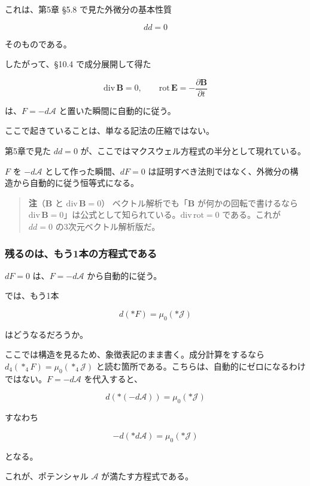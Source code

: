 \documentclass[a4paper,12pt,openany]{book}
\begin{document}
これは、第5章 §5.8 で見た外微分の基本性質

\[
dd=0
\]

そのものである。

したがって、§10.4 で成分展開して得た

\[
\mathrm{div}\,\mathbf{B}=0,
\qquad
\mathrm{rot}\,\mathbf{E}
=
-\frac{\partial\mathbf{B}}{\partial t}
\]

は、\(F=-d\mathcal{A}\) と置いた瞬間に自動的に従う。

ここで起きていることは、単なる記法の圧縮ではない。

第5章で見た \(dd=0\)
が、ここではマクスウェル方程式の半分として現れている。

\(F\) を \(-d\mathcal{A}\) として作った瞬間、\(dF=0\)
は証明すべき法則ではなく、外微分の構造から自動的に従う恒等式になる。

\begin{quote}
\textbf{注}（\(\mathbf{B}\) と \(\mathrm{div}\,\mathbf{B}=0\)）
ベクトル解析でも「\(\mathbf{B}\) が何かの回転で書けるなら
\(\mathrm{div}\,\mathbf{B}=0\)」は公式として知られている。\(\mathrm{div}\,\mathrm{rot}=0\)
である。これが \(dd=0\) の3次元ベクトル解析版だ。
\end{quote}

\hypertarget{ux6b8bux308bux306eux306fux3082ux30461ux672cux306eux65b9ux7a0bux5f0fux3067ux3042ux308b}{%
\subsubsection{残るのは、もう1本の方程式である}\label{ux6b8bux308bux306eux306fux3082ux30461ux672cux306eux65b9ux7a0bux5f0fux3067ux3042ux308b}}

\(dF=0\) は、\(F=-d\mathcal{A}\) から自動的に従う。

では、もう1本

\[
d(\ast F)
=
\mu_0(\ast\mathcal{J})
\]

はどうなるだろうか。

ここでは構造を見るため、象徴表記のまま書く。成分計算をするなら
\(d_4(\ast_4F)=\mu_0(\ast_4\mathcal{J})\)
と読む箇所である。こちらは、自動的にゼロになるわけではない。\(F=-d\mathcal{A}\)
を代入すると、

\[
d(\ast(-d\mathcal{A}))
=
\mu_0(\ast\mathcal{J})
\]

すなわち

\[
-d(\ast d\mathcal{A})
=
\mu_0(\ast\mathcal{J})
\]

となる。

これが、ポテンシャル \(\mathcal{A}\) が満たす方程式である。
\end{document}
